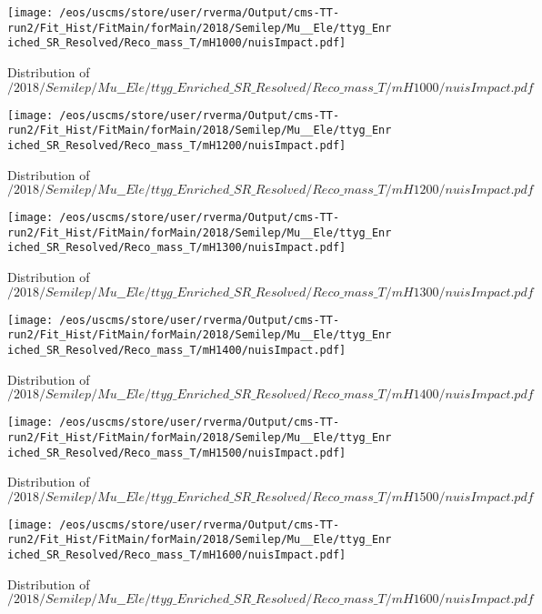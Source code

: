 \begin{figure}
\centering
\texttt{[image: /eos/uscms/store/user/rverma/Output/cms-TT-run2/Fit\_Hist/FitMain/forMain/2018/Semilep/Mu\_\_Ele/ttyg\_Enriched\_SR\_Resolved/Reco\_mass\_T/mH1000/nuisImpact.pdf]}
\caption{Distribution of $/2018/Semilep/Mu\_\_Ele/ttyg\_Enriched\_SR\_Resolved/Reco\_mass\_T/mH1000/nuisImpact.pdf$}
\end{figure}

\begin{figure}
\centering
\texttt{[image: /eos/uscms/store/user/rverma/Output/cms-TT-run2/Fit\_Hist/FitMain/forMain/2018/Semilep/Mu\_\_Ele/ttyg\_Enriched\_SR\_Resolved/Reco\_mass\_T/mH1200/nuisImpact.pdf]}
\caption{Distribution of $/2018/Semilep/Mu\_\_Ele/ttyg\_Enriched\_SR\_Resolved/Reco\_mass\_T/mH1200/nuisImpact.pdf$}
\end{figure}

\begin{figure}
\centering
\texttt{[image: /eos/uscms/store/user/rverma/Output/cms-TT-run2/Fit\_Hist/FitMain/forMain/2018/Semilep/Mu\_\_Ele/ttyg\_Enriched\_SR\_Resolved/Reco\_mass\_T/mH1300/nuisImpact.pdf]}
\caption{Distribution of $/2018/Semilep/Mu\_\_Ele/ttyg\_Enriched\_SR\_Resolved/Reco\_mass\_T/mH1300/nuisImpact.pdf$}
\end{figure}

\begin{figure}
\centering
\texttt{[image: /eos/uscms/store/user/rverma/Output/cms-TT-run2/Fit\_Hist/FitMain/forMain/2018/Semilep/Mu\_\_Ele/ttyg\_Enriched\_SR\_Resolved/Reco\_mass\_T/mH1400/nuisImpact.pdf]}
\caption{Distribution of $/2018/Semilep/Mu\_\_Ele/ttyg\_Enriched\_SR\_Resolved/Reco\_mass\_T/mH1400/nuisImpact.pdf$}
\end{figure}

\begin{figure}
\centering
\texttt{[image: /eos/uscms/store/user/rverma/Output/cms-TT-run2/Fit\_Hist/FitMain/forMain/2018/Semilep/Mu\_\_Ele/ttyg\_Enriched\_SR\_Resolved/Reco\_mass\_T/mH1500/nuisImpact.pdf]}
\caption{Distribution of $/2018/Semilep/Mu\_\_Ele/ttyg\_Enriched\_SR\_Resolved/Reco\_mass\_T/mH1500/nuisImpact.pdf$}
\end{figure}

\begin{figure}
\centering
\texttt{[image: /eos/uscms/store/user/rverma/Output/cms-TT-run2/Fit\_Hist/FitMain/forMain/2018/Semilep/Mu\_\_Ele/ttyg\_Enriched\_SR\_Resolved/Reco\_mass\_T/mH1600/nuisImpact.pdf]}
\caption{Distribution of $/2018/Semilep/Mu\_\_Ele/ttyg\_Enriched\_SR\_Resolved/Reco\_mass\_T/mH1600/nuisImpact.pdf$}
\end{figure}

